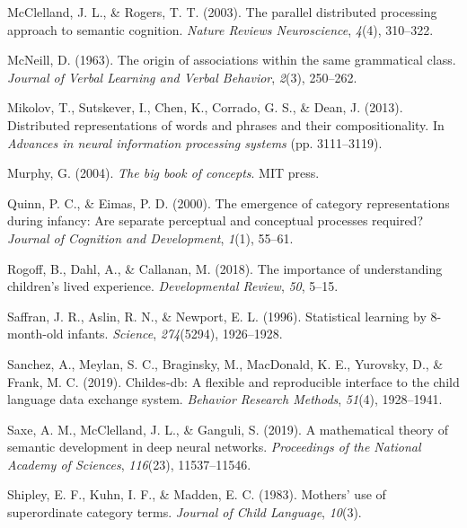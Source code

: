 \documentclass[english,,man]{apa6}
\begin{document}
\leavevmode\hypertarget{ref-mcclelland2003}{}%
McClelland, J. L., \& Rogers, T. T. (2003). The parallel distributed processing approach to semantic cognition. \emph{Nature Reviews Neuroscience}, \emph{4}(4), 310--322.

\leavevmode\hypertarget{ref-mcneill1963origin}{}%
McNeill, D. (1963). The origin of associations within the same grammatical class. \emph{Journal of Verbal Learning and Verbal Behavior}, \emph{2}(3), 250--262.

\leavevmode\hypertarget{ref-mikolov2013}{}%
Mikolov, T., Sutskever, I., Chen, K., Corrado, G. S., \& Dean, J. (2013). Distributed representations of words and phrases and their compositionality. In \emph{Advances in neural information processing systems} (pp. 3111--3119).

\leavevmode\hypertarget{ref-murphy2004big}{}%
Murphy, G. (2004). \emph{The big book of concepts}. MIT press.

\leavevmode\hypertarget{ref-quinn2000}{}%
Quinn, P. C., \& Eimas, P. D. (2000). The emergence of category representations during infancy: Are separate perceptual and conceptual processes required? \emph{Journal of Cognition and Development}, \emph{1}(1), 55--61.

\leavevmode\hypertarget{ref-rogoff2018}{}%
Rogoff, B., Dahl, A., \& Callanan, M. (2018). The importance of understanding children's lived experience. \emph{Developmental Review}, \emph{50}, 5--15.

\leavevmode\hypertarget{ref-saffran1996}{}%
Saffran, J. R., Aslin, R. N., \& Newport, E. L. (1996). Statistical learning by 8-month-old infants. \emph{Science}, \emph{274}(5294), 1926--1928.

\leavevmode\hypertarget{ref-sanchez2019}{}%
Sanchez, A., Meylan, S. C., Braginsky, M., MacDonald, K. E., Yurovsky, D., \& Frank, M. C. (2019). Childes-db: A flexible and reproducible interface to the child language data exchange system. \emph{Behavior Research Methods}, \emph{51}(4), 1928--1941.

\leavevmode\hypertarget{ref-saxe2019mathematical}{}%
Saxe, A. M., McClelland, J. L., \& Ganguli, S. (2019). A mathematical theory of semantic development in deep neural networks. \emph{Proceedings of the National Academy of Sciences}, \emph{116}(23), 11537--11546.

\leavevmode\hypertarget{ref-shipley1983}{}%
Shipley, E. F., Kuhn, I. F., \& Madden, E. C. (1983). Mothers' use of superordinate category terms. \emph{Journal of Child Language}, \emph{10}(3).
\end{document}
